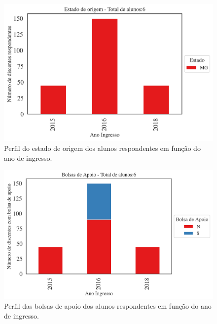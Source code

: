 \documentclass[a4paper,10pt]{article}
\begin{document}
\begin{figure}[h]
\centering
\includegraphics[width=0.85\linewidth]{quantitativos_estado_de_origem_313087.png}
\caption{\label{fig:estado_ano} Perfil do estado de origem dos alunos respondentes em função do ano de ingresso.}
\end{figure}

\begin{figure}[h]
\centering
\includegraphics[width=0.85\linewidth]{quantitativos_bolsa_de_apoio_313087.png}
\caption{\label{fig:bolsa_ano} Perfil das bolsas de apoio  dos alunos respondentes em função do ano de ingresso.}
\end{figure}
\end{document}
